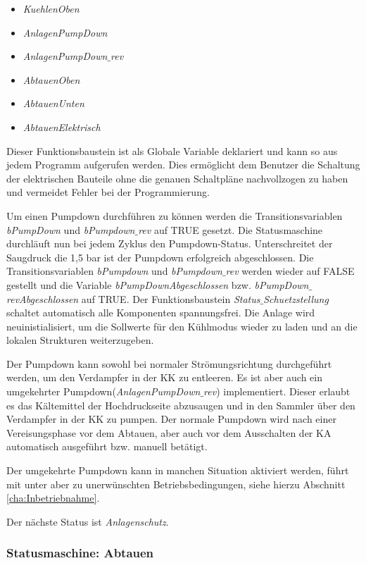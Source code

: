 \begin{itemize}
\item	\textit{KuehlenOben}
\item	\textit{AnlagenPumpDown}
\item	\textit{AnlagenPumpDown$\_$rev}
\item	\textit{AbtauenOben}
\item	\textit{AbtauenUnten}
\item	\textit{AbtauenElektrisch}
\end{itemize}

Dieser Funktionsbaustein ist als Globale Variable deklariert und kann so aus jedem Programm aufgerufen werden. Dies ermöglicht dem Benutzer die Schaltung der elektrischen Bauteile ohne die genauen Schaltpläne nachvollzogen zu haben und vermeidet Fehler bei der Programmierung. 

Um einen Pumpdown durchführen zu können werden die Transitionsvariablen \textit{bPumpDown} und \textit{bPumpdown$\_$rev}  auf TRUE gesetzt. Die Statusmaschine durchläuft nun bei jedem Zyklus den Pumpdown-Status. Unterschreitet der Saugdruck die 1,5 bar ist der Pumpdown erfolgreich abgeschlossen. Die Transitionsvariablen \textit{bPumpdown} und \textit{bPumpdown$\_$rev} werden wieder auf FALSE gestellt und die Variable \textit{bPumpDownAbgeschlossen} bzw. \textit{bPumpDown$\_$revAbgeschlossen} auf TRUE. Der Funktionsbaustein \textit{Status$\_$Schuetzstellung} schaltet automatisch alle Komponenten spannungsfrei. Die Anlage wird neuinistialisiert, um die Sollwerte für den Kühlmodus wieder zu laden und an die lokalen Strukturen weiterzugeben. 

Der Pumpdown kann sowohl bei normaler Strömungsrichtung durchgeführt werden, um den Verdampfer in der KK zu entleeren. Es ist aber auch ein umgekehrter Pumpdown(\textit{AnlagenPumpDown$\_$rev}) implementiert. Dieser erlaubt es das Kältemittel der Hochdruckseite abzusaugen und in den Sammler über den Verdampfer in der KK zu pumpen. Der normale Pumpdown wird nach einer Vereisungsphase vor dem Abtauen, aber auch vor dem Ausschalten der KA automatisch ausgeführt bzw. manuell betätigt. 

Der umgekehrte Pumpdown kann in manchen Situation aktiviert werden, führt mit unter aber zu unerwünschten Betriebsbedingungen, siehe hierzu Abschnitt \ref{cha:Inbetriebnahme}. 

Der nächste Status ist \textit{Anlagenschutz}.

\subsubsection*{Statusmaschine: Abtauen}

